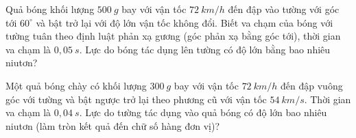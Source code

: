 \begin{ex}%
Quả bóng khối lượng $500\ g$ bay với vận tốc $72\ km/h$ đến đập vào tường với góc tới $60^\circ$ và bật trở lại với độ lớn vận tốc không đổi. Biết va chạm của bóng với tường tuân theo định luật phản xạ gương (góc phản xạ bằng góc tới), thời gian va chạm là $0,05\ s$. Lực do bóng tác dụng lên tường có độ lớn bằng bao nhiêu niutơn?
 \end{ex}
\begin{ex}%
Một quả bóng chày có khối lượng $300\ g$ bay với vận tốc $72\ km/h$ đến đập vuông góc với tường và bật ngược trở lại theo phương cũ với vận tốc $54\ km/s$. Thời gian va chạm là $0,04\ s$. Lực do tường tác dụng vào quả bóng có độ lớn bao nhiêu niutơn (làm tròn kết quả đến chữ số hàng đơn vị)?
\loigiai{}
\end{ex}
